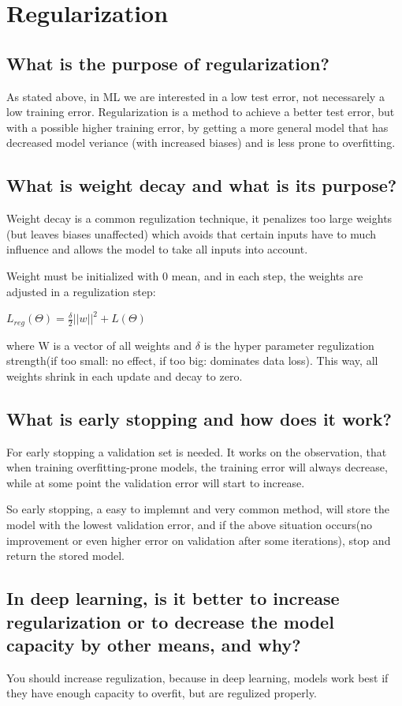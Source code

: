 \section{Regularization}
\subsection{What is the purpose of regularization?}

As stated above, in ML we are interested in a low test error, not necessarely a low training error. Regularization is a method to achieve a better test error, but with a possible higher training error, by getting a more general model that has decreased model veriance (with increased biases) and is less prone to overfitting. 

\subsection{What is weight decay and what is its purpose?}
Weight decay is a common regulization technique, it penalizes too large weights (but leaves biases unaffected) which avoids that certain inputs have to much influence and allows the model to take all inputs into account. 

Weight must be initialized with 0 mean, and in each step, the weights are adjusted in a regulization step:

$L_{reg}(\Theta) = \frac{\delta}{2}||w||^2 + L(\Theta)$

where W is a vector of all weights and $\delta$ is the hyper parameter regulization strength(if too small: no effect, if too big: dominates data loss).
This way, all weights shrink in each update and decay to zero.  

\subsection{What is early stopping and how does it work?}
For early stopping a validation set is needed. It works on the observation, that when training overfitting-prone models, the training error will always decrease, while at some point the validation error will start to increase. 

So early stopping, a easy to implemnt and very common method, will store the model with the lowest validation error, and if the above situation occurs(no improvement or even higher error on validation after some iterations), stop and return the stored model.

\subsection{In deep learning, is it better to increase regularization or to decrease the model capacity by other means, and why?}
You should increase regulization, because in deep learning, models work best if they have enough capacity to overfit, but are regulized properly.


